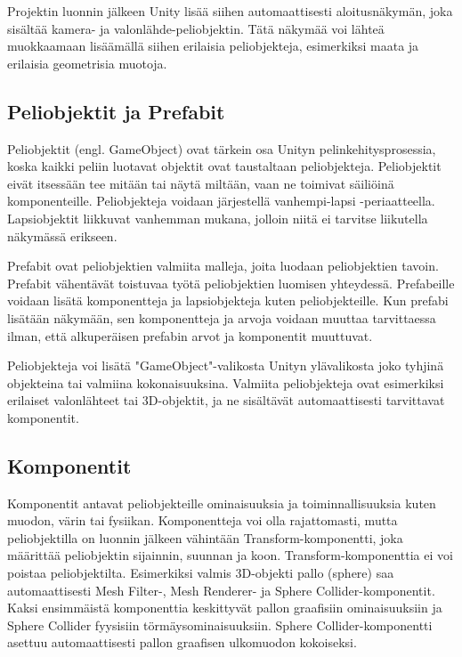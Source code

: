 \documentclass[utf8]{gradu3}
\begin{document}
Projektin luonnin jälkeen Unity lisää siihen automaattisesti aloitusnäkymän, joka sisältää kamera- ja valonlähde-peliobjektin. Tätä näkymää voi lähteä muokkaamaan lisäämällä siihen erilaisia peliobjekteja, esimerkiksi maata ja erilaisia geometrisia muotoja.

\subsection{Peliobjektit ja Prefabit}

Peliobjektit (engl. GameObject) ovat tärkein osa Unityn pelinkehitysprosessia, koska kaikki peliin luotavat objektit ovat taustaltaan peliobjekteja. Peliobjektit eivät itsessään tee mitään tai näytä miltään, vaan ne toimivat säiliöinä komponenteille. Peliobjekteja voidaan järjestellä vanhempi-lapsi -periaatteella. Lapsiobjektit liikkuvat vanhemman mukana, jolloin niitä ei tarvitse liikutella näkymässä erikseen.

Prefabit ovat peliobjektien valmiita malleja, joita luodaan peliobjektien tavoin. Prefabit vähentävät toistuvaa työtä peliobjektien luomisen yhteydessä. Prefabeille voidaan lisätä komponentteja ja lapsiobjekteja kuten peliobjekteille. Kun prefabi lisätään näkymään, sen komponentteja ja arvoja voidaan muuttaa tarvittaessa ilman, että alkuperäisen prefabin arvot ja komponentit muuttuvat.

Peliobjekteja voi lisätä "GameObject"-valikosta Unityn ylävalikosta joko tyhjinä objekteina tai valmiina kokonaisuuksina. Valmiita peliobjekteja ovat esimerkiksi erilaiset valonlähteet tai 3D-objektit, ja ne sisältävät automaattisesti tarvittavat komponentit.

\subsection{Komponentit}

Komponentit antavat peliobjekteille ominaisuuksia ja toiminnallisuuksia kuten muodon, värin tai fysiikan. Komponentteja voi olla rajattomasti, mutta peliobjektilla on luonnin jälkeen vähintään Transform-komponentti, joka määrittää peliobjektin sijainnin, suunnan ja koon. Transform-komponenttia ei voi poistaa peliobjektilta. Esimerkiksi valmis 3D-objekti pallo (sphere) saa automaattisesti Mesh Filter-, Mesh Renderer- ja Sphere Collider-komponentit. Kaksi ensimmäistä komponenttia keskittyvät pallon graafisiin ominaisuuksiin ja Sphere Collider fyysisiin törmäysominaisuuksiin. Sphere Collider-komponentti asettuu automaattisesti pallon graafisen ulkomuodon kokoiseksi.
\end{document}
